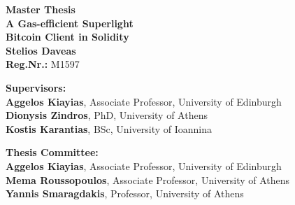 \begin{center}
    \vspace{3cm}
    \large \textbf{Master Thesis}\\
    \vspace{3cm}
    \textbf{A Gas-efficient Superlight\\Bitcoin Client in Solidity}\\
    \vspace{3cm}
    \large \textbf{Stelios Daveas}\\
    \textbf{Reg.Nr.:} M1597

    \vspace{5cm}
    \begin{flushleft}
        \textbf{Supervisors:}\\
        \hspace{2cm}
        \textbf{Aggelos Kiayias}, Associate Professor, University of Edinburgh\\
        \hspace{2cm}
        \textbf{Dionysis Zindros}, PhD, University of Athens\\
        \hspace{2cm}
        \textbf{Kostis Karantias}, BSc, University of Ioannina

        \vspace{1cm}

        \textbf{Thesis Committee:}\\
        \hspace{2cm}
        \textbf{Aggelos Kiayias}, Associate Professor, University of Edinburgh\\
        \hspace{2cm}
        \textbf{Mema Roussopoulos}, Associate Professor, University of Athens\\
        \hspace{2cm}
        \textbf{Yannis Smaragdakis}, Professor, University of Athens

    \end{flushleft}
\end{center}


\pagebreak
